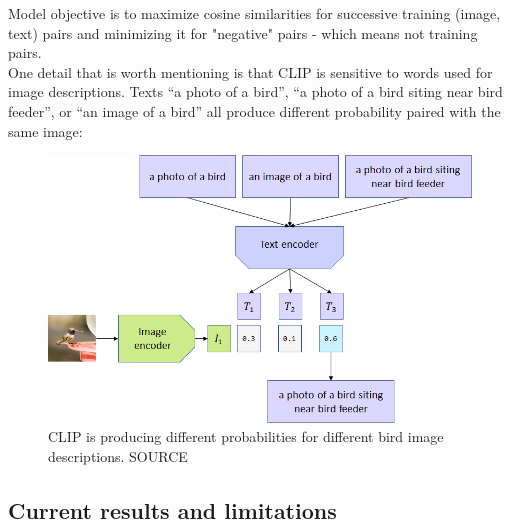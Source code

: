 \documentclass[12pt,a4paper,openany]{book}
\begin{document}

Model objective is to maximize cosine similarities for successive training (image, text) pairs and minimizing it for "negative" pairs - which means not training pairs. \\
One detail that is worth mentioning is that CLIP is sensitive to words used for image descriptions. Texts “a photo of a bird”, “a photo of a bird siting near bird feeder”, or “an image of a bird” all produce different probability paired with the same image:

 \begin{figure}[ht!]
     \centering
     \includegraphics[scale=0.5]{figs/clip_model_3.png}
     \caption{CLIP is producing different probabilities for different bird image descriptions. SOURCE}
 \end{figure}
 \newpage
 \subsection*{Current results and limitations}
 
\end{document}
